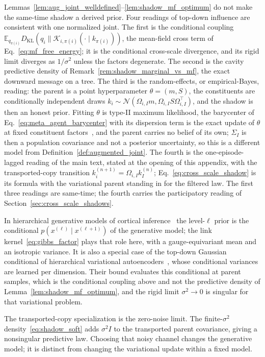 Lemmas~\ref{lem:aug_joint_welldefined}--\ref{lem:shadow_mf_optimum} do not make the same-time shadow a derived prior. Four readings of top-down influence are consistent with one normalized joint. The first is the conditional coupling $\mathbb{E}_{q_{\pi(i)}} D_{\mathrm{KL}}(q_i\|\mathcal{K}_{i,\pi(i)}(\cdot \mid k_{\pi(i)}))$, the mean-field cross term of Eq.~\eqref{eq:mf_free_energy}; it is the conditional cross-scale divergence, and its rigid limit diverges as $1/\sigma^2$ unless the factors degenerate. The second is the cavity predictive density of Remark~\ref{rem:shadow_marginal_vs_mf}, the exact downward message on a tree. The third is the random-effects, or empirical-Bayes, reading: the parent is a point hyperparameter $\theta = (m, S)$, the constituents are conditionally independent draws $k_i \sim \mathcal{N}(\Omega_{i,I} m, \Omega_{i,I} S \Omega_{i,I}^\top)$, and the shadow is then an honest prior. Fitting $\theta$ is type-II maximum likelihood, the barycenter of Eq.~\eqref{eq:meta_agent_barycenter} with its dispersion term is the exact update of $\theta$ at fixed constituent factors~\cite{Neal1998}, and the parent carries no belief of its own; $\Sigma_I$ is then a population covariance and not a posterior uncertainty, so this is a different model from Definition~\ref{def:augmented_joint}. The fourth is the one-episode-lagged reading of the main text, stated at the opening of this appendix, with the transported-copy transition $k_i^{(n+1)} = \Omega_{i,I} k_I^{(n)}$; Eq.~\eqref{eq:cross_scale_shadow} is its formula with the variational parent standing in for the filtered law. The first three readings are same-time; the fourth carries the participatory reading of Section~\ref{sec:cross_scale_shadows}.

In hierarchical generative models of cortical inference~\cite{friston2008hierarchical, parr2022active} the level-$\ell$ prior is the conditional $p(x^{(\ell)} \mid x^{(\ell+1)})$ of the generative model; the link kernel~\eqref{eq:gibbs_factor} plays that role here, with a gauge-equivariant mean and an isotropic variance. It is also a special case of the top-down Gaussian conditional of hierarchical variational autoencoders~\cite{Sonderby2016}, whose conditional variances are learned per dimension. Their bound evaluates this conditional at parent samples, which is the conditional coupling above and not the predictive density of Lemma~\ref{lem:shadow_mf_optimum}, and the rigid limit $\sigma^2 \to 0$ is singular for that variational problem.

The transported-copy specialization is the zero-noise limit. The finite-$\sigma^2$ density~\eqref{eq:shadow_soft} adds $\sigma^2 I$ to the transported parent covariance, giving a nonsingular predictive law. Choosing that noisy channel changes the generative model; it is distinct from changing the variational update within a fixed model.


